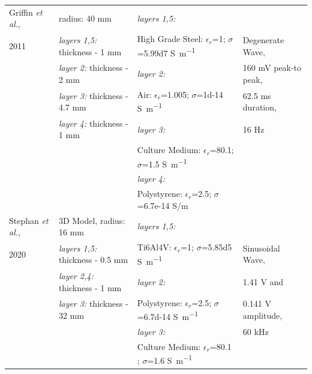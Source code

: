 \begin{table}[p]
\begin{tabularx}{\textwidth}{l l l l}
Griffin \textit{et al.}, & radius: 40 \si{\milli\meter} & \textit{layers 1,5:} & \\
 2011 \cite{Griffin2011-bb} & \textit{layers 1,5:} thickness - 1 \si{\milli\meter} & High Grade Steel: $\epsilon_{r}$=1; $\sigma$=\num{5.99d7} \si{\siemens\per\meter} & Degenerate Wave, \\
& \textit{layer 2:} thickness - 2 \si{\milli\meter} & \textit{layer 2:} & 160 \si{\milli\volt} peak-to peak,\\
& \textit{layer 3:} thickness - 4.7 \si{\milli\meter} &  Air: $\epsilon_{r}$=1.005; $\sigma$=\num{1d-14} \si{\siemens\per\meter} \cite{Seran2017-qg} & 62.5 \si{\milli\second} duration,\\
& \textit{layer 4:} thickness - 1 \si{\milli\meter} & \textit{layer 3:} & 16 \si{\hertz}\\
&  & Culture Medium: $\epsilon_{r}$=80.1; $\sigma$=1.5 \si{\siemens\per\meter} \cite{Visone2018-sa} & \\
&  & \textit{layer 4:} & \\
& & Polystyrene: $\epsilon_{r}$=2.5; $\sigma$=6.7e-14 S/m \cite{Qi2011-se} & \\ \cmidrule(l){1-4}


Stephan \textit{et al.}, & 3D Model, radius: 16 \si{\milli\meter} & \textit{layers 1,5:} & \\
2020 \cite{Stephan2020-qh} & \textit{layers 1,5:} thickness - 0.5 \si{\milli\meter} & Ti6Al4V: $\epsilon_{r}$=1; $\sigma$=\num{5.85d5} \si{\siemens\per\meter} \cite{Mitchell2004-ue} & Sinusoidal Wave, \\
& \textit{layer 2,4:}  thickness - 1 \si{\milli\meter} & \textit{layer 2:} & 1.41 \si{\volt} and \\
& \textit{layer 3:} thickness - 32 \si{\milli\meter} & Polystyrene: $\epsilon_{r}$=2.5; $\sigma$=\num{6.7d-14} \si{\siemens\per\meter} \cite{Qi2011-se} & 0.141 \si{\volt} amplitude, \\
& & \textit{layer 3:} & 60 \si{\kilo\hertz} \\
&  & Culture Medium: $\epsilon_{r}$=80.1 \cite{Visone2018-sa}; $\sigma$=1.6 \si{\siemens\per\meter} & \\ \cmidrule(l){1-4}



\end{tabularx}
\end{table}
